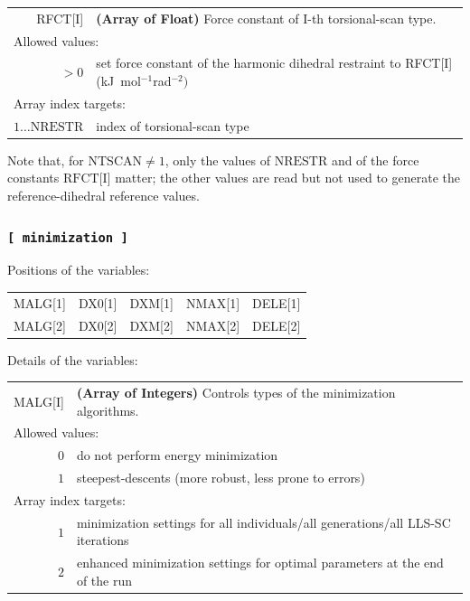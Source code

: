 \documentclass[10pt,a4paper,openany]{memoir}
\numberwithin{equation}{section}
\begin{document}
{
\begin{tabular}{r@{ : }l}
\label{descr:rfct}
      RFCT[I]&\textbf{(Array of Float)} Force constant of I-th torsional-scan type.                                      \\ 
\multicolumn{2}{l}{Allowed values:} \\ 
    \(>0\)&set force constant of the harmonic dihedral restraint to RFCT[I] (kJ~mol$^{-1}$rad$^{-2})$        \\ 
\multicolumn{2}{l}{Array index targets:} \\ 
\(1 \ldots \text{NRESTR} \)&index of torsional-scan type                                                                      \\ 
\end{tabular}
\vspace{1ex}
}

Note that, for $\text{NTSCAN} \neq 1$, only the values of
$\text{NRESTR}$ and of the force constants $\text{RFCT[I]}$ matter;
the other values are read but not used to generate the
reference-dihedral reference values.

\subsubsection{\texttt{[~minimization~]}}
\label{sec:inp-minimization}


\noindent Positions of the variables:
\begin{center}
  \begin{tabular}{lllll}
    MALG[1] & DX0[1] & DXM[1] & NMAX[1] & DELE[1] \\
    MALG[2] & DX0[2] & DXM[2] & NMAX[2] & DELE[2] \\
  \end{tabular}
\end{center}

\noindent Details of the variables:
\vspace{2ex}

{
\begin{tabular}{r@{ : }l}
\label{descr:malg}
      MALG[I]&\textbf{(Array of Integers)} Controls types of the minimization algorithms.                                                                             \\ 
\multicolumn{2}{l}{Allowed values:} \\ 
     \(0\)&do not perform energy minimization \\
     \(1\)&steepest-descents (more robust, less prone to errors)                                                                                    \\ 
\multicolumn{2}{l}{Array index targets:} \\ 
     \(1\)&minimization settings for all individuals/all generations/all LLS-SC iterations \\
     \(2\)&enhanced minimization settings for optimal parameters at the end of the run \\
\end{tabular}
\vspace{1ex}
}
\end{document}
